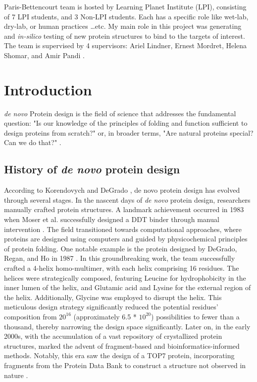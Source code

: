 \documentclass[11pt,a4paper]{article}
\begin{document}
Paris-Bettencourt team is hosted by Learning Planet Institute (LPI),
consisting of 7 LPI students, and 3 Non-LPI students.
Each has a specific role like wet-lab, dry-lab, or human practices \ldots etc. 
My main role in this project was generating and \emph{in-silico} testing of new protein structures to bind to the targets of interest.
The team is supervised by 4 supervisors: Ariel Lindner, Ernest Mordret, Helena 
Shomar, and Amir Pandi \cite{paris_bettencourt_team}.

\section{Introduction}

\emph{de novo} Protein design is the field of science that addresses the 
fundamental question: "Is our knowledge of the principles of folding 
and function sufficient to design proteins from scratch?" 
\cite{korendovych2020novo} or, in broader terms, "Are natural proteins 
special? Can we do that?" \cite{hecht2018natural}.

\subsection{History of \emph{de novo} protein design}

According to Korendovych and DeGrado \cite{korendovych2020novo}, de 
novo protein design has evolved through several stages.
In the nascent days of \emph{de novo} protein design, researchers manually 
crafted protein structures. A landmark achievement occurred in 1983 
when Moser et al. successfully designed a DDT binder through manual 
intervention \cite{moser1983artificial}.
The field transitioned towards computational approaches, where proteins 
are designed using computers and guided by physicochemical principles 
of protein folding. One notable example is the protein designed by 
DeGrado, Regan, and Ho in 1987 \cite{degrado1987design}. In this 
groundbreaking work, the team successfully crafted a 4-helix 
homo-multimer, with each helix comprising 16 residues. The helices were 
strategically composed, featuring Leucine for hydrophobicity in the 
inner lumen of the helix, and Glutamic acid and Lysine for the external 
region of the helix. Additionally, Glycine was employed to disrupt the 
helix. This meticulous design strategy significantly reduced the 
potential residues' composition from $20^{16}$ (approximately 6.5 * $10^
{20}$) possibilities to fewer than a thousand, thereby narrowing the 
design space significantly. 
Later on, in the early 2000s, with the accumulation of a vast repository 
of crystallized protein structures,  marked the advent of 
fragment-based and bioinformatics-informed methods. Notably, this era 
saw the design of a  TOP7 protein, incorporating fragments from the 
Protein Data Bank to construct a structure not observed in nature \cite
{kuhlman2003design}.
\end{document}
